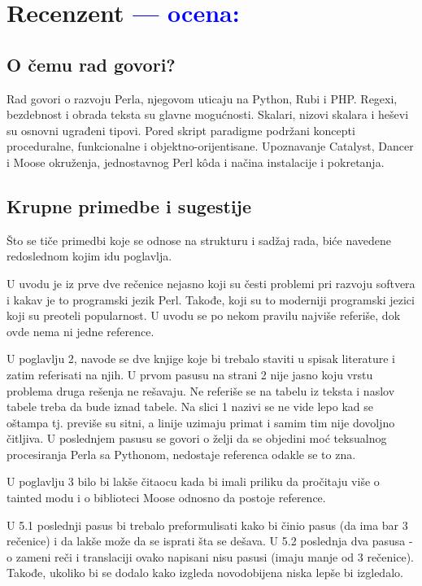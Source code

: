 \documentclass[a4paper]{report}
\newcommand{\odgovor}[1]{\textcolor{blue}{#1}}
\begin{document}
\chapter{Recenzent \odgovor{--- ocena:} }


\section{O čemu rad govori?}
Rad govori o razvoju Perla, njegovom uticaju na Python, Rubi i PHP. Regexi, bezdebnost i obrada teksta su glavne mogućnosti. Skalari, nizovi skalara i heševi su osnovni ugrađeni tipovi. Pored skript paradigme podržani koncepti proceduralne, funkcionalne i objektno-orijentisane. Upoznavanje Catalyst, Dancer i Moose okruženja, jednostavnog Perl k\^{o}da i načina instalacije i pokretanja. 

\section{Krupne primedbe i sugestije}

Što se tiče primedbi koje se odnose na strukturu i sadžaj rada, biće navedene redoslednom kojim idu poglavlja.

U uvodu je iz prve dve rečenice nejasno koji su česti problemi pri razvoju softvera i kakav je to programski jezik Perl. Takođe, koji su to moderniji programski jezici koji su preoteli popularnost. U uvodu se po nekom pravilu 
najviše referiše, dok ovde nema ni jedne reference.

U poglavlju 2, navode se dve knjige koje bi trebalo staviti u spisak literature i zatim referisati na njih. U prvom pasusu na strani 2 nije jasno koju vrstu problema druga rešenja ne rešavaju. Ne referiše se na tabelu iz teksta i naslov tabele treba da bude iznad tabele. Na slici 1 nazivi se ne vide lepo kad se oštampa tj. previše su sitni, a linije uzimaju primat i samim tim nije dovoljno čitljiva. U poslednjem pasusu se govori o želji da se objedini moć teksualnog procesiranja Perla sa Pythonom, nedostaje referenca odakle se to zna.

U poglavlju 3 bilo bi lakše čitaocu kada bi imali priliku da pročitaju više o tainted modu i o biblioteci Moose odnosno da postoje reference.

U 5.1 poslednji pasus bi trebalo preformulisati kako bi činio pasus (da ima bar 3 rečenice) i da lakše može da se isprati šta se dešava. U 5.2 poslednja dva pasusa - o zameni reči i translaciji ovako napisani nisu pasusi (imaju manje od 3 rečenice). Takođe, ukoliko bi se dodalo kako izgleda novodobijena niska lepše bi izgledalo.
\end{document}
